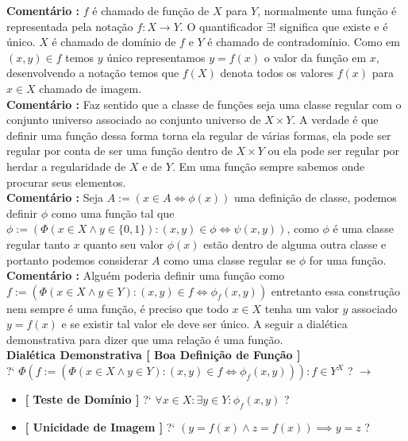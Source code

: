 \documentclass[10pt,a4paper]{report}
\begin{document}
\textbf{Comentário :} $f$ é chamado de função de $X$ para $Y$, normalmente uma função é representada pela notação $ f : X \rightarrow Y $. O quantificador $\exists !$ significa que existe e é único. $X$ é chamado de domínio de $f$ e $Y$ é chamado de contradomínio. Como em $(x,y) \in f$ temos $y$ único representamos $y = f(x)$ o valor da função em $x$, desenvolvendo a notação temos que $f(X)$ denota todos os valores $f(x)$ para $x \in X$ chamado de imagem.  \\

\textbf{Comentário :} Faz sentido que a classe de funções seja uma classe regular com o conjunto universo associado ao conjunto universo de $ X \times Y $. A verdade é que definir uma função dessa forma torna ela regular de várias formas, ela pode ser regular por conta de ser uma função dentro de $ X \times Y $ ou ela pode ser regular por herdar a regularidade de $X$ e de $Y$. Em uma função sempre sabemos onde procurar seus elementos. \\

\textbf{Comentário :} Seja $ A:= ( x \in A \iff \phi(x) ) $ uma definição de classe, podemos definir $ \phi $ como uma função tal que $ \phi := ( \Phi(x \in X \wedge y \in \{0,1\}) : (x,y) \in \phi \iff \psi(x,y) ) $, como $\phi$ é uma classe regular tanto $x$ quanto seu valor $\phi(x)$ estão dentro de alguma outra classe e portanto podemos considerar $A$ como uma classe regular se $\phi$ for uma função.\\

\textbf{Comentário :} Alguém poderia definir uma função como $ f := ( \Phi( x \in X \wedge y \in Y ) : (x,y) \in f \iff \phi_f(x,y) ) $ entretanto essa construção nem sempre é uma função, é preciso que todo $x \in X$ tenha um valor $y$ associado $y =f(x)$ e se existir tal valor ele deve ser único. A seguir a dialética demonstrativa para dizer que uma relação é uma função.\\

\textbf{Dialética Demonstrativa [ Boa Definição de Função ]}\\

?` $ \Phi( f :=( \Phi(x \in X \wedge y \in Y) : (x,y) \in f \iff \phi_f(x,y)  ) ) : f \in Y^X $ ? $\rightarrow$

\begin{itemize}
	\item[ (1) ] \textbf{[ Teste de Domínio ]} ?` $ \forall x \in X :\exists y \in Y: \phi_f(x,y) $ ?
	\item[ (2) ] \textbf{[ Unicidade de Imagem ]} ?` $ ( y = f(x) \wedge z = f(x) )\implies y=z $ ?
\end{itemize}
\end{document}
